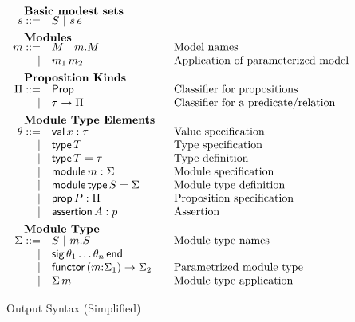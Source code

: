 \begin{figure}
\[\begin{array}{rl@{\qquad}l}
		\noalign{\textbf{Basic modest sets}}
                \os ::=
                    & \oS \obar \oapp{\os}{\oe} & \\[5pt]

		\noalign{\textbf{Modules}}		
		\om ::= 
		    & \oM  \obar \oselect{\om}{\oM}&\mbox{Model names}\\
		  | & \oapp{\om_1}{\om_2}&\mbox{Application of parameterized model}\\[5pt]
		
		\noalign{\textbf{Proposition Kinds}}
		\opt ::=
		    & \oProp & \mbox{Classifier for propositions}\\
		   |& \oarrow{\oty}{\opt} & \mbox{Classifier for a predicate/relation}\\[5pt] 
		
		\noalign{\textbf{Module Type Elements}}
		\ote ::=
		     & \ovalspec{\ox}{\oty}&\mbox{Value specification}\\
		   | & \otyspec{\oTY}&\mbox{Type specification}\\
                   | & \otydef{\oTY}{\oty}&\mbox{Type definition}\\
		   | & \omodulespec{\om}{\omt}&\mbox{Module specification}\\
		   | & \osignatdef{\oMT}{\omt}&\mbox{Module type definition}\\
                   | & \ospropspec{\oP}{\opt}&\mbox{Proposition specification}\\
                   | & \oassertion{A}{\op}&\mbox{Assertion}\\[5pt]

  		\noalign{\textbf{Module Type}}
		\omt ::= 
		     & \oMT \obar \oselect{\om}{\oMT} & \mbox{Module type names}\\
		   	| & \osig{\ote_1 \ldots \ote_n}\\
                        | & \ofunctor{\om}{\omt_1}{\omt_2} & \mbox{Parametrized module type}\\
		  	| & \oapp{\omt}{\om} & \mbox{Module type application}
	\end{array}
	\]
	\label{fig:input}
	\caption{Output Syntax (Simplified)}
\end{figure}




